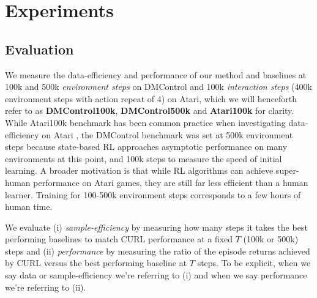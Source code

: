 \section{Experiments}

\subsection{Evaluation}

We measure the data-efficiency and performance of our method and baselines at 100k and 500k \textit{environment steps} on DMControl and 100k \textit{interaction steps} (400k environment steps with action repeat of 4) on Atari, which we will henceforth refer to as \textbf{DMControl100k}, \textbf{DMControl500k} and \textbf{Atari100k} for clarity. While Atari100k benchmark has been common practice when  investigating data-efficiency on Atari  \cite{kaiser2019model, van2019use, kielak2020rainbow}, the DMControl benchmark was set at 500k environment steps because state-based RL approaches asymptotic performance on many environments at this point, and 100k steps to measure the speed of initial learning. A broader motivation is that while RL algorithms can achieve super-human performance on Atari games, they are still far less efficient than a human learner. Training for 100-500k environment steps corresponds to a few hours of human time. 

We evaluate (i) \textit{sample-efficiency} by measuring how many steps it takes the best performing baselines to match CURL performance at a fixed $T$ (100k or 500k) steps and (ii) \textit{performance} by measuring the ratio of the episode returns achieved by CURL versus the best performing baseline at $T$ steps. To be explicit, when we say data or sample-efficiency we're referring to (i) and when we say performance we're referring to (ii).

